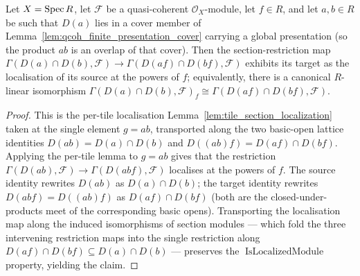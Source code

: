 \begin{lemma}
  \label{lem:overlap_section_localization}
  Let \(X = \operatorname{Spec} R\), let \(\mathcal{F}\) be a quasi-coherent \(\mathcal{O}_X\)-module, let \(f \in R\),
  and let \(a, b \in R\) be such that \(D(a)\) lies in a cover member of
  Lemma~\ref{lem:qcoh_finite_presentation_cover} carrying a global presentation (so the product \(a b\) is
  an overlap of that cover). Then the section-restriction map
  \(\Gamma(D(a) \cap D(b), \mathcal{F}) \to \Gamma(D(af) \cap D(bf), \mathcal{F})\) exhibits its target as
  the localisation of its source at the powers of \(f\); equivalently, there is a canonical \(R\)-linear
  isomorphism \(\Gamma(D(a) \cap D(b), \mathcal{F})_f \cong \Gamma(D(af) \cap D(bf), \mathcal{F})\).
\end{lemma}
\begin{proof}
  This is the per-tile localisation Lemma~\ref{lem:tile_section_localization} taken at the single element
  \(g = a b\), transported along the two basic-open lattice identities \(D(ab) = D(a) \cap D(b)\) and
  \(D((ab)f) = D(af) \cap D(bf)\). Applying the per-tile lemma to \(g = a b\) gives that the restriction
  \(\Gamma(D(ab), \mathcal{F}) \to \Gamma(D(abf), \mathcal{F})\) localises at the powers of \(f\). The
  source identity rewrites \(D(ab)\) as \(D(a) \cap D(b)\); the target identity rewrites \(D(abf) =
  D((ab)f)\) as \(D(af) \cap D(bf)\) (both are the closed-under-products meet of the corresponding basic
  opens). Transporting the localisation map along the induced isomorphisms of section modules — which
  fold the three intervening restriction maps into the single restriction along
  \(D(af) \cap D(bf) \subseteq D(a) \cap D(b)\) — preserves the
  \(\operatorname{IsLocalizedModule}\) property, yielding the claim.
\end{proof}

